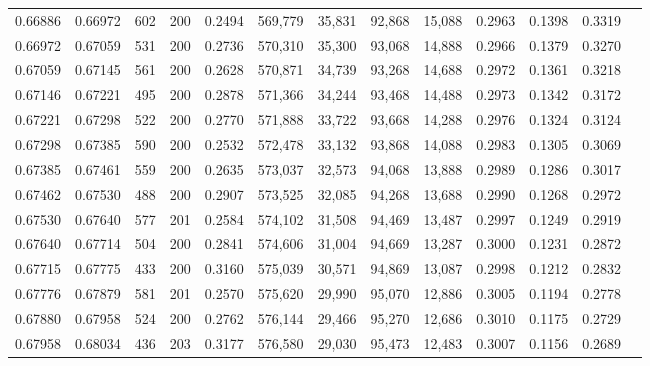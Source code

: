 \begin{tabular}{rrrrrrrrrrrrr}
0.66886 & 0.66972 &   602 & 200 &                                     0.2494 & 569,779 &  35,831 &  92,868 &  15,088 & 0.2963 & 0.1398 & 0.3319 \\
0.66972 & 0.67059 &   531 & 200 &                                     0.2736 & 570,310 &  35,300 &  93,068 &  14,888 & 0.2966 & 0.1379 & 0.3270 \\
0.67059 & 0.67145 &   561 & 200 &                                     0.2628 & 570,871 &  34,739 &  93,268 &  14,688 & 0.2972 & 0.1361 & 0.3218 \\
0.67146 & 0.67221 &   495 & 200 &                                     0.2878 & 571,366 &  34,244 &  93,468 &  14,488 & 0.2973 & 0.1342 & 0.3172 \\
0.67221 & 0.67298 &   522 & 200 &                                     0.2770 & 571,888 &  33,722 &  93,668 &  14,288 & 0.2976 & 0.1324 & 0.3124 \\
0.67298 & 0.67385 &   590 & 200 &                                     0.2532 & 572,478 &  33,132 &  93,868 &  14,088 & 0.2983 & 0.1305 & 0.3069 \\
0.67385 & 0.67461 &   559 & 200 &                                     0.2635 & 573,037 &  32,573 &  94,068 &  13,888 & 0.2989 & 0.1286 & 0.3017 \\
0.67462 & 0.67530 &   488 & 200 &                                     0.2907 & 573,525 &  32,085 &  94,268 &  13,688 & 0.2990 & 0.1268 & 0.2972 \\
0.67530 & 0.67640 &   577 & 201 &                                     0.2584 & 574,102 &  31,508 &  94,469 &  13,487 & 0.2997 & 0.1249 & 0.2919 \\
0.67640 & 0.67714 &   504 & 200 &                                     0.2841 & 574,606 &  31,004 &  94,669 &  13,287 & 0.3000 & 0.1231 & 0.2872 \\
0.67715 & 0.67775 &   433 & 200 &                                     0.3160 & 575,039 &  30,571 &  94,869 &  13,087 & 0.2998 & 0.1212 & 0.2832 \\
0.67776 & 0.67879 &   581 & 201 &                                     0.2570 & 575,620 &  29,990 &  95,070 &  12,886 & 0.3005 & 0.1194 & 0.2778 \\
0.67880 & 0.67958 &   524 & 200 &                                     0.2762 & 576,144 &  29,466 &  95,270 &  12,686 & 0.3010 & 0.1175 & 0.2729 \\
0.67958 & 0.68034 &   436 & 203 &                                     0.3177 & 576,580 &  29,030 &  95,473 &  12,483 & 0.3007 & 0.1156 & 0.2689 \\

\end{tabular}
